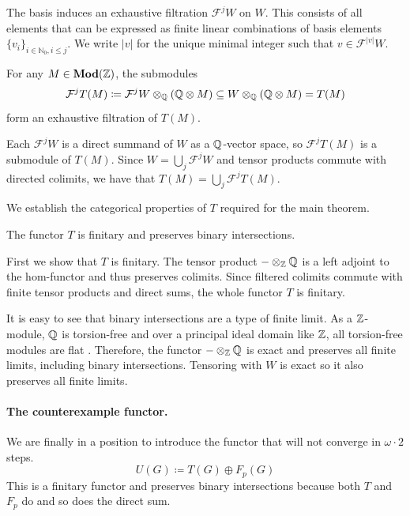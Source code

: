 \documentclass[runningheads]{llncs}
\begin{document}
The basis induces an exhaustive filtration $\mathcal F^jW$ on $W$. This consists of all elements that can be expressed as finite linear combinations of basis elements $\{v_i\}_{i \in \mathbb N_0,  i \le j}.$ We write $|v|$ for the unique minimal integer such that $v \in \mathcal F^{|v|}W$.

\begin{propositionE}
For any $M \in \operatorname{\mathbf{Mod}}(\mathbb{Z})$, the submodules
\begin{equation*}
\mathcal F^j T(M) \coloneqq \mathcal F^j W \otimes_{\mathbb{Q}} \left(\mathbb{Q} \otimes M
\right) \subseteq W \otimes_{\mathbb{Q}} \left(\mathbb{Q} \otimes M\right) = T(M)
\end{equation*}
form an exhaustive filtration of $T(M)$.
\end{propositionE}
\begin{proofE}
Each $\mathcal F^j W$ is a direct summand of $W$ as a $\mathbb{Q}$-vector space, so $\mathcal F^j T(M)$ is a submodule of $T(M)$.
Since $W = \bigcup_j \mathcal F^j W$ and tensor products commute with directed colimits, we have that $T(M) = \bigcup_j \mathcal F^j T(M)$.
\end{proofE}
We establish the categorical properties of $T$ required for the main theorem.
\begin{propositionE}
The functor $T$ is finitary and preserves binary intersections.
\end{propositionE}
\begin{proofE}
   First we show that $T$ is finitary. The tensor product $-\otimes_{\mathbb{Z}} \mathbb{Q}$ is a left adjoint to the hom-functor and thus preserves colimits. Since filtered colimits commute with finite tensor products and direct sums, the whole functor $T$ is finitary.
    
    
It is easy to see that binary intersections are a type of finite limit.
As a $\mathbb{Z}$-module,  $\mathbb{Q}$ is torsion-free and over a principal ideal domain like $\mathbb{Z}$, all torsion-free modules are flat \cite{weibel94}. 
Therefore, the functor $-\otimes_{\mathbb{Z}} \mathbb{Q}$ is exact and preserves all finite limits, including binary intersections. Tensoring with $W$ is exact so it also preserves all finite limits.
   
\end{proofE}

\paragraph{The counterexample functor.}
We are finally in a position to introduce the functor that will not converge in $\omega \cdot 2$ steps.
$$
U(G) \coloneqq  T(G)\oplus F_p(G)
$$
This is a finitary functor and preserves binary intersections because both $T$ and $F_p$ do and so does the direct sum.
\end{document}
